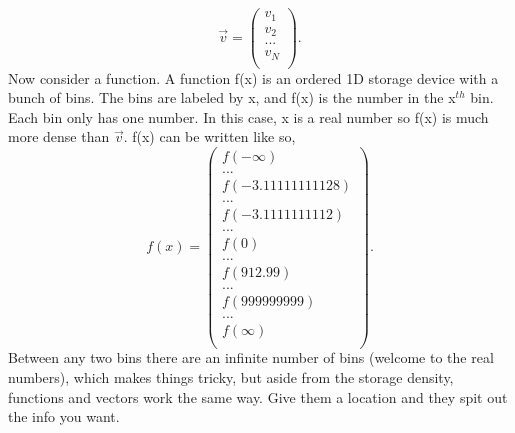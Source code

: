 \documentclass[12pt]{article}
\begin{document}
\begin{equation}
\vec{v} = 
\begin{pmatrix}
v_1 \\
v_2 \\
... \\
v_N \\
\end{pmatrix}.
\end{equation}
Now consider a function. A function f(x) is an ordered 1D storage device with a bunch of bins. The bins are labeled by x, and f(x) is the number in the x$^{th}$ bin. Each bin only has one number. In this case, x is a real number so f(x) is much more dense than $\vec{v}$. f(x) can be written like so,  
\begin{equation}
f(x) = 
\begin{pmatrix}
f(-\infty) \\
... \\
f(-3.11111111128) \\
... \\
f(-3.1111111112) \\
... \\
f(0) \\
... \\
f(912.99) \\
... \\
f(999999999) \\
... \\
f(\infty) \\
\end{pmatrix}.
\end{equation}
Between any two bins there are an infinite number of bins (welcome to the real numbers), which makes things tricky, but aside from the storage density, functions and vectors work the same way. Give them a location and they spit out the info you want. 
\end{document}

